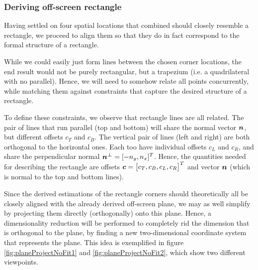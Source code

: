  



\subsubsection{Deriving off-screen rectangle}

Having settled on four spatial locations that combined should closely resemble a rectangle, we proceed to align them so that they do in fact correspond to the formal structure of a rectangle. 

While we could easily just form lines between the chosen corner locations, the end result would not be purely rectangular, but a trapezium (i.e. a quadrilateral with no parallel).  Hence, we will need to somehow relate all points concurrently, while  matching them against constraints that capture the desired structure of a rectangle.

To define these constraints, we observe that rectangle lines are all related. The pair of lines that run parallel (top and bottom) will share the normal vector $\boldsymbol{n}$, but different offsets $c_T$ and $c_B$. The vertical pair of lines (left and right) are both orthogonal to the horizontal ones. Each too have individual offsets $c_L$ and $c_R$, and share the perpendicular normal $\boldsymbol{n^\perp} = [-n_y, n_x]^T$. Hence, the quantities needed for describing the rectangle are offsets $\boldsymbol{c} = \begin{bmatrix} c_T, c_B, c_L, c_R  \end{bmatrix}^T $ and vector $\boldsymbol{n}$ (which is normal to the top and bottom lines). 


Since the derived estimations of the rectangle corners should theoretically all  be closely aligned with the already derived off-screen plane, we may as well simplify by projecting them directly (orthogonally) onto this plane. Hence, a dimensionality reduction will be performed to completely rid the dimension that is orthogonal to the plane, by finding a new two-dimensional coordinate system that represents the plane. This idea is exemplified in figure \ref{fig:planeProjectNoFit1} and \ref{fig:planeProjectNoFit2}, which show two different viewpoints. 


